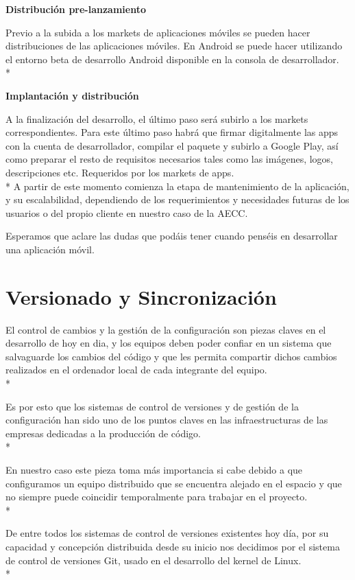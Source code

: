 \documentclass[../pfc.tex]{subfiles}
\begin{document}
	\textbf{Distribución pre-lanzamiento}
	
	Previo a la subida a los markets de aplicaciones móviles se pueden hacer distribuciones de las aplicaciones móviles. En Android se puede hacer utilizando el entorno beta de desarrollo  Android disponible en la consola de desarrollador.\\*
	
	\textbf{Implantación y distribución}
	
	A la finalización del desarrollo, el último paso será subirlo a los markets correspondientes. Para este último paso habrá que firmar digitalmente las apps con la cuenta de desarrollador, compilar el paquete y subirlo a Google Play, así como preparar el resto de requisitos necesarios tales como las imágenes, logos, descripciones etc. Requeridos por los markets de apps.\\*
	A partir de este momento comienza la etapa de mantenimiento de la aplicación, y su escalabilidad, dependiendo de los requerimientos y necesidades futuras de los usuarios o del propio cliente en  nuestro caso de la AECC.
	
	Esperamos que aclare las dudas que podáis tener cuando penséis en desarrollar una aplicación móvil.
	
	\section{Versionado y Sincronización}

	El control de cambios y la gestión de la configuración son piezas claves en  el desarrollo de hoy en dia, y los equipos deben poder confiar en un sistema que salvaguarde los cambios del código y que les permita compartir dichos cambios realizados en el ordenador local de cada integrante del equipo.\\*
	
	Es por esto que los sistemas de control de versiones y de gestión de la configuración han sido uno de los puntos claves en las infraestructuras de las empresas dedicadas a la producción de código. \\*
	
	En nuestro caso este pieza toma más importancia si cabe debido a que configuramos un equipo distribuido que se encuentra alejado en el espacio y que no siempre puede coincidir temporalmente para trabajar en el proyecto.\\* 
	
	De entre todos los sistemas de control de versiones existentes hoy día, por su capacidad y concepción distribuida desde su inicio nos decidimos por el sistema de control de versiones Git, usado en el desarrollo del kernel de Linux.\\*
	
\end{document}
